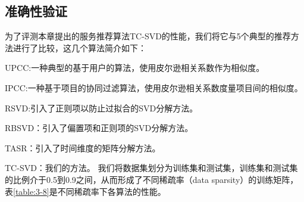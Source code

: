 \documentclass[master,winfonts]{njuthesis}
\begin{document}
\subsection{准确性验证}
为了评测本章提出的服务推荐算法TC-SVD的性能，我们将它与5个典型的推荐方法进行了比较，这几个算法简介如下：

UPCC:一种典型的基于用户的算法，使用皮尔逊相关系数作为相似度\cite{Breese1998Empirical}。

IPCC:一种基于项目的协同过滤算法，使用皮尔逊相关系数度量项目间的相似度\cite{Kang2012AWSR}。

RSVD:引入了正则项以防止过拟合的SVD分解方法。

RBSVD：引入了偏置项和正则项的SVD分解方法\cite{Koren2010Collaborative}。

TASR：引入了时间维度的矩阵分解方法\cite{Tian2014Time}。

TC-SVD：我们的方法。
我们将数据集划分为训练集和测试集，训练集和测试集的比例介于0.5到0.9之间，从而形成了不同稀疏率（data sparsity）的训练矩阵，表\ref{table:3-8}是不同稀疏率下各算法的性能。
\end{document}
